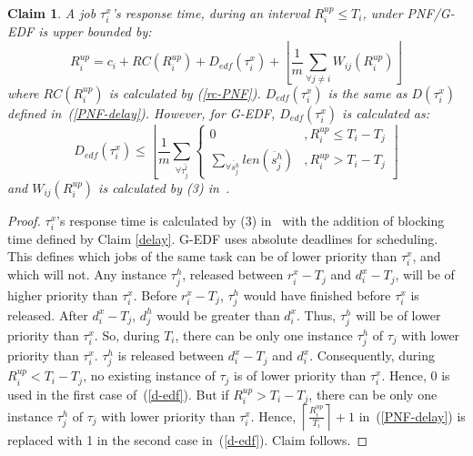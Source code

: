 \documentclass[twocolumn]{article}
\newtheorem{clm}{Claim}
\newtheorem{proof}{Proof}
\begin{document}
\begin{clm}\label{response time ecm PNF}
A job $\tau_{i}^{x}$'s response time, during an interval $R_i^{up}\le T_{i}$, under PNF/G-EDF is upper bounded by:
\begin{equation}
R_{i}^{up}=c_{i}+RC(R_i^{up})+D_{edf}(\tau_{i}^{x})+\left\lfloor \frac{1}{m}\sum_{\forall j\ne i}W_{ij}(R_{i}^{up})\right\rfloor 
\end{equation}
where $RC(R_i^{up})$ is calculated by (\ref{rc-PNF}). $D_{edf}(\tau_{i}^{x})$
is the same as $D(\tau_{i}^{x})$ defined in~(\ref{PNF-delay}). However, for G-EDF, $D_{edf}(\tau_i^x)$ is calculated as:
\begin{equation}
D_{edf}(\tau_{i}^{x})\le\left\lfloor \frac{1}{m}\sum_{\forall\bar{\tau_{j}^{l}}}\begin{cases}
0 & ,R_i^{up}\le T_{i}-T_{j}\\
\sum_{\forall\ddot{s_{j}^{h}}}len\left(\ddot{s_{j}^{h}}\right) & ,R_i^{up}>T_{i}-T_{j}
\end{cases}\right\rfloor \label{d-edf}
\end{equation}
and $W_{ij}(R_{i}^{up})$ is calculated by (3) in~\cite{stmconcurrencycontrol:emsoft11}.
\end{clm}
\begin{proof}\normalfont
$\tau_{i}^{x}$'s response time is calculated by (3) in~\cite{stmconcurrencycontrol:emsoft11} with the addition of blocking time defined by Claim \ref{delay}. G-EDF uses absolute deadlines for scheduling. This defines which jobs of the same task can be of lower priority than $\tau_{i}^{x}$, and which will not. Any instance $\tau_j^h$, released between $r_i^x - T_j$ and $d_i^x - T_j$, will be of higher priority than $\tau_i^x$. Before $r_i^x-T_j$, $\tau_j^h$ would have finished before $\tau_i^x$ is released. After $d_i^x-T_j$, $d_j^h$ would be greater than $d_i^x$. Thus, $\tau_j^h$ will be of lower priority than $\tau_i^x$. So, during $T_i$, there can be only one instance $\tau_j^h$ of $\tau_j$ with lower priority than $\tau_i^x$. $\tau_j^h$ is released between $d_i^x-T_j$ and $d_i^x$. Consequently, during $R_i^{up}<T_i-T_j$, no existing instance of $\tau_j$ is of lower  priority than $\tau_i^x$. Hence, 0 is used in the first case of~(\ref{d-edf}). But if $R_i^{up}>T_i-T_j$, there can be only one instance $\tau_j^h$ of $\tau_j$ with lower priority than $\tau_i^x$. Hence, $\left\lceil\frac{R_i^{up}}{T_i}\right\rceil+1$ in~(\ref{PNF-delay}) is replaced with 1 in the second case in~(\ref{d-edf}). Claim follows.
\end{proof}
\end{document}
